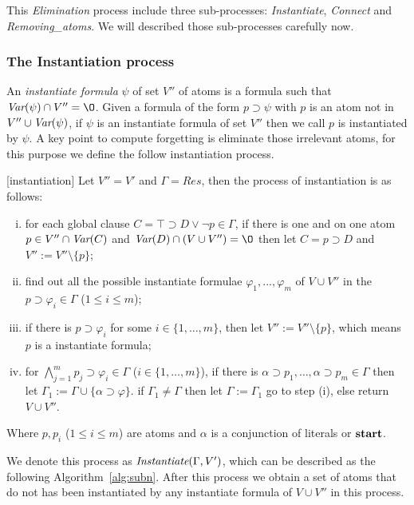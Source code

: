 \documentclass[letterpaper]{article} %
\begin{document}
This \emph{Elimination} process include three sub-processes: \emph{Instantiate}, \emph{Connect} and \emph{Removing\_atoms}. We will described those sub-processes carefully now.
\subsubsection{The Instantiation process}
An \emph{instantiate formula} $\psi$ of set $V''$ of atoms is a formula such that $\Var(\psi) \cap V'' ={\O}$.
Given a formula of the form $p \supset \psi$ with $p$ is an atom not in $V'' \cup \textit{Var}(\psi)$, if $\psi$ is an  instantiate formula of set $V''$ then we call $p$ is instantiated by $\psi$.
A key point to compute forgetting is eliminate those irrelevant atoms, for this purpose we define the follow instantiation process.
\begin{definition}\label{def:subst}
[instantiation] Let $V''=V'$ and $\Gamma=Res$, then the process of instantiation is as follows:
\begin{enumerate}[(i)]
  \item for each global clause $C= \top \supset D \vee \neg p \in \Gamma$, if there is one and on one atom $p \in V''\cap \textit{Var}(C)$  and $\Var(D) \cap (V \cup V'')= {\O}$ then let $C = p \supset D$ and $V'':=V''\setminus \{p\}$;
  \item find out all the possible instantiate formulae $\varphi_1, ..., \varphi_m$ of $V \cup V''$ in the $p\supset \varphi_i \in \Gamma$ ($1\leq i\leq m$);
  \item if there is $p\supset \varphi_i$ for some $i\in \{1,\dots, m\}$, then let $V'':=V''\setminus \{p\}$, which means $p$ is a instantiate formula;
  \item for $\bigwedge_{j=1}^m p_j \supset \varphi_i \in \Gamma$ ($i\in \{1,\dots, m\}$), if there is $\alpha \supset p_1,\dots, \alpha \supset p_m \in \Gamma$ then let $\Gamma_1 := \Gamma \cup \{\alpha \supset \varphi\}$. if $\Gamma_1\neq \Gamma$ then let $\Gamma:=\Gamma_1$ go to step (i), else return $V \cup V''$.
\end{enumerate}
Where $p, p_i$ ($1 \leq i\leq m$) are atoms and $\alpha$ is a conjunction of literals or $\textbf{start}$.
\end{definition}

We denote this process as $\emph{Instantiate}(\Gamma, V')$, which can be described as the following Algorithm~\ref{alg:subn}.
 After this process we obtain a set of atoms that do not has been instantiated by any instantiate formula of $V\cup V''$ in this process.
\end{document}
